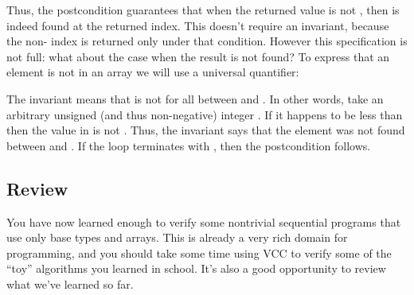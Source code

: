 {{\noindent
Thus, the postcondition guarantees that when the returned value
is not , then  is indeed found at the returned
index.
This doesn't require an invariant, because the non- index
is returned only under that condition.
However this specification is not full: what about the case when the result is not found?
To express that an element is not in an array we will use a universal quantifier:


\noindent
The invariant  means that 
 is not  for all  between  and .
In other words, take an arbitrary unsigned (and thus non-negative) integer . 
If it happens to be less than  then the value in  is not .
Thus, the invariant says that the element was not found between 
and .
If the loop terminates with , then the postcondition follows.


\subsection{Review}


You have now learned enough to verify some nontrivial sequential
programs that use only base types and arrays.  This is already a very
rich domain for programming, and you should take some time using VCC
to verify some of the ``toy'' algorithms you learned in school. It's
also a good opportunity to review what we've learned so far.

}}
